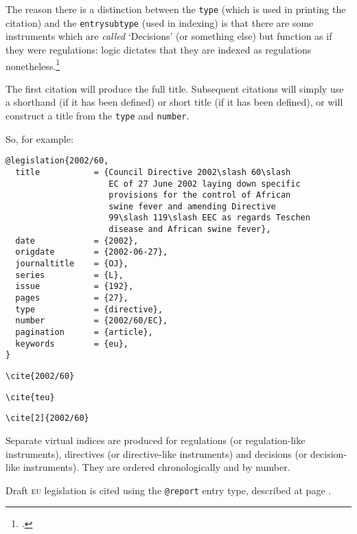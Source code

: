 \documentclass[a4paper,
               11pt,
	       DIV=1,			   
	       footinclude=false]
	      {scrartcl}
\newcounter{egcounter}\setcounter{egcounter}{0}
\newlength{\boxwidth}
\newenvironment{bibexample}[1][]
{%
  \medskip\par\noindent\ignorespaces
  \marginpar{[\refstepcounter{egcounter}\arabic{egcounter}]\label{#1}}%
  \setlength{\boxwidth}{0.95\linewidth}%
  \addtolength{\boxwidth}{-2\fboxsep}
  \addtolength{\boxwidth}{-2\fboxrule}
  \begin{lrbox}{\boxcontainer}
  \begin{minipage}[t]{\boxwidth}%
}
{%
  \end{minipage}\end{lrbox}%
  \colorbox{gray!30}{\usebox{\boxcontainer}}
  \par\medskip}
\newcommand{\egcite}[1]{{\texttt{\textbackslash cite#1}}}
\begin{document}
The reason there is a distinction between the \texttt{type} (which is used in
printing the citation) and the \texttt{entrysubtype} (used in indexing) is that
there are some instruments which are \emph{called} `Decisions' (or
something else) but function as if they were regulations: logic
dictates that they are indexed as regulations
nonetheless.\footcite[The curious can consult][763 n 502]{lenaerts2}

The first citation will produce the full title. Subsequent citations
will simply use a shorthand (if it has been defined) or short title
(if it has been defined), or will construct a title from the
\texttt{type} and \texttt{number}.

So, for example:
\begin{bibexample}[2002/60]
\begin{verbatim}
@legislation{2002/60,
  title           = {Council Directive 2002\slash 60\slash 
                     EC of 27 June 2002 laying down specific 
                     provisions for the control of African 
                     swine fever and amending Directive  
                     99\slash 119\slash EEC as regards Teschen  
                     disease and African swine fever},
  date            = {2002},
  origdate        = {2002-06-27},
  journaltitle    = {OJ},
  series          = {L},
  issue           = {192},
  pages           = {27},
  type            = {directive},
  number          = {2002/60/EC},
  pagination      = {article},
  keywords        = {eu},
}
\end{verbatim}
\end{bibexample}

{\sloppy
\begin{description}
\item[\egcite{\{2002/60\}}] \cite{2002/60}
\item[\egcite{\{teu\}}] \cite{teu}
\item[\egcite{[2]\{2002/60\}}] \cite[2]{2002/60}
\end{description}}

Separate virtual indices are produced for regulations (or
regulation-like instruments), directives (or directive-like
instruments) and decisions (or decision-like instruments). They are
ordered chronologically and by number.

Draft \textsc{eu} legislation is cited using the \texttt{@report}
entry type, described at page \pageref{drafteu}.
\end{document}

